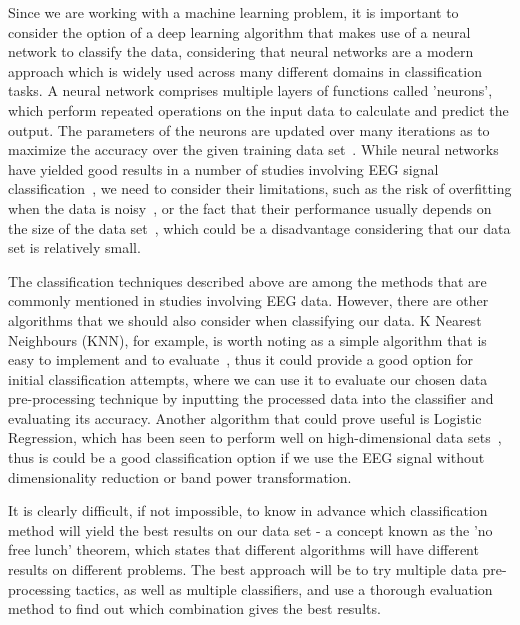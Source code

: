 \documentclass{mprop}
\begin{document}
Since we are working with a machine learning problem, it is important to consider the option of a deep learning algorithm that makes use of a neural network to classify the data, considering that neural networks are a modern approach which is widely used across many different domains in classification tasks. A neural network comprises multiple layers of functions called 'neurons', which perform repeated operations on the input data to calculate and predict the output. The parameters of the neurons are updated over many iterations as to maximize the accuracy over the given training data set~\cite{yiu_understanding_2019}. While neural networks have yielded good results in a number of studies involving EEG signal classification~\cite{vuckovic_prediction_2018,subasi_neural_2005,lotte_review_2007}, we need to consider their limitations, such as the risk of overfitting when the data is noisy~\cite{lotte_review_2007}, or the fact that their performance usually depends on the size of the data set~\cite{mishkin_systematic_2017}, which could be a disadvantage considering that our data set is relatively small.

The classification techniques described above are among the methods that are commonly mentioned in studies involving EEG data. However, there are other algorithms that we should also consider when classifying our data. K Nearest Neighbours (KNN), for example, is worth noting as a simple algorithm that is easy to implement and to evaluate~\cite{harrison_machine_2019}, thus it could provide a good option for initial classification attempts, where we can use it to evaluate our chosen data pre-processing technique by inputting the processed data into the classifier and evaluating its accuracy. Another algorithm that could prove useful is Logistic Regression, which has been seen to perform well on high-dimensional data sets~\cite{moore_logistic_2004}, thus is could be a good classification option if we use the EEG signal without dimensionality reduction or band power transformation.

It is clearly difficult, if not impossible, to know in advance which classification method will yield the best results on our data set - a concept known as the 'no free lunch' theorem, which states that different algorithms will have different results on different problems. The best approach will be to try multiple data pre-processing tactics, as well as multiple classifiers, and use a thorough evaluation method to find out which combination gives the best results.
\end{document}
